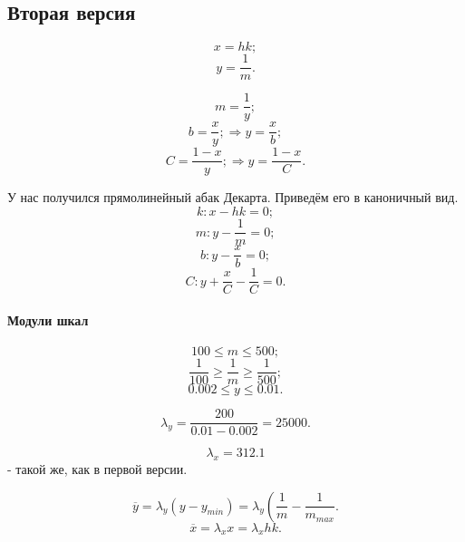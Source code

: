 \subsection{Вторая версия}

$$x = hk;$$
$$y = \frac{1}{m}.$$

$$m = \frac{1}{y};$$
$$b = \frac{x}{y}; \Rightarrow y = \frac{x}{b};$$
$$C = \frac{1 - x}{y}; \Rightarrow y = \frac{1 - x}{C}.$$

У нас получился прямолинейный абак Декарта.
Приведём его в каноничный вид.
$$k: x - hk = 0;$$
$$m: y - \frac{1}{m} = 0;$$
$$b: y - \frac{x}{b} = 0;$$
$$C: y + \frac{x}{C} - \frac{1}{C} =0.$$

\paragraph{Модули шкал}
$$100 \le m \le 500;$$
$$\frac{1}{100} \ge \frac{1}{m} \ge \frac{1}{500};$$
$$0.002 \le y \le 0.01.$$

$$\lambda_y = \frac{200}{0.01 - 0.002} = 25000.$$


$$\lambda_x = 312.1$$
- такой же, как в первой версии.

$$\overline{y} = \lambda_y (y - y_{min}) = \lambda_y \left( \frac{1}{m} - \frac{1}{m_{max}}.$$
$$\overline{x} = \lambda_x x = \lambda_x h k.$$

